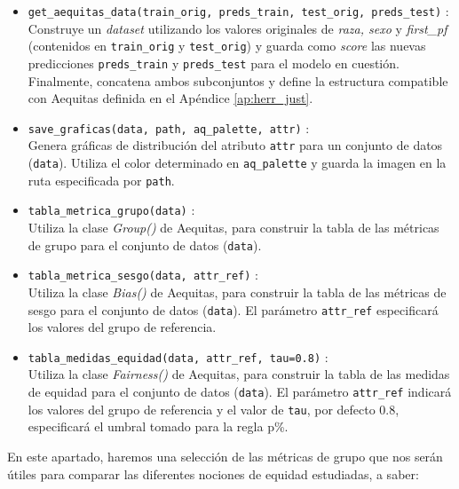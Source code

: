 \documentclass[oneside,openright,titlepage,numbers=noenddot,openany,headinclude,footinclude=true,
cleardoublepage=empty,abstractoff,BCOR=5mm,paper=a4,fontsize=12pt,main=spanish]{scrreprt}
\begin{document}
\begin{itemize}
    \item \texttt{get\_aequitas\_data(train\_orig, preds\_train, test\_orig, preds\_test)} :\\
    Construye un \textit{dataset} utilizando los valores originales de \textit{raza, sexo} y \textit{first\_pf} (contenidos en \texttt{train\_orig} y \texttt{test\_orig}) y guarda como \textit{score} las nuevas predicciones \texttt{preds\_train} y \texttt{preds\_test} para el modelo en cuestión. Finalmente, concatena ambos subconjuntos y define la estructura compatible con Aequitas definida en el Apéndice \ref{ap:herr_just}.\\
    \item \texttt{save\_graficas(data, path, aq\_palette, attr)} :\\
    Genera gráficas de distribución del atributo \texttt{attr} para un conjunto de datos (\texttt{data}). Utiliza el color determinado en \texttt{aq\_palette} y guarda la imagen en la ruta especificada por \texttt{path}.\\
    \item \texttt{tabla\_metrica\_grupo(data)} :\\
    Utiliza la clase \textit{Group()} de Aequitas, para construir la tabla de las métricas de grupo para el conjunto de datos (\texttt{data}).\\
    \item \texttt{tabla\_metrica\_sesgo(data, attr\_ref)} :\\
    Utiliza la clase \textit{Bias()} de Aequitas, para construir la tabla de las métricas de sesgo para el conjunto de datos (\texttt{data}). El parámetro \texttt{attr\_ref} especificará los valores del grupo de referencia.\\
    \item \texttt{tabla\_medidas\_equidad(data, attr\_ref, tau=0.8)} :\\
    Utiliza la clase \textit{Fairness()} de Aequitas, para construir la tabla de las medidas de equidad para el conjunto de datos (\texttt{data}). El parámetro \texttt{attr\_ref} indicará los valores del grupo de referencia y el valor de \texttt{tau}, por defecto 0.8, especificará el umbral tomado para la regla p\%.\\
\end{itemize}

En este apartado, haremos una selección de las métricas de grupo que nos serán útiles para comparar las diferentes nociones de equidad estudiadas, a saber:
\end{document}
